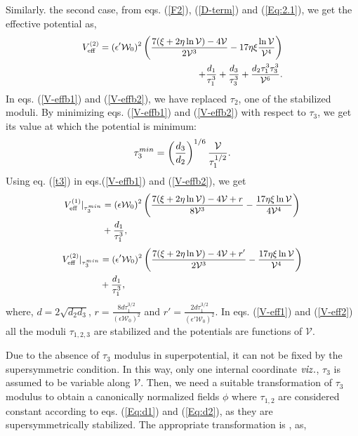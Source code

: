 \documentclass[doublecol]{epl2}
\begin{document}
Similarly. the second case, from eqs. (\ref{F2}), (\ref{D-term}) and (\ref{Eq:2.1}), we get the effective potential as, 
\begin{equation}\small
\begin{split}
    V_{\mathrm{eff}}^{(2)}=(\epsilon'\mathcal{W}_0)^2\left(\frac{7(\xi+2\eta\ln\mathcal{V})-4\mathcal{V}}{2\mathcal{V}^3}-17\eta\xi\frac{\ln\mathcal{V}}{\mathcal{V}^4}\right)\\+\frac{d_1}{\tau_1^3}+\frac{d_3}{\tau_3^3}+\frac{d_2\tau_1^3\tau_3^3}{\mathcal{V}^6}.
    \label{V-effb2}
    \end{split}
\end{equation}In eqs. (\ref{V-effb1}) and (\ref{V-effb2}), we have replaced $\tau_2$, one of the stabilized moduli.    By minimizing eqs. (\ref{V-effb1}) and (\ref{V-effb2}) with respect to $\tau_3$, we get its value at which the potential is minimum:
\begin{equation}\small
    \tau_3^{min}=\left(\frac{d_3}{d_2}\right)^{1/6}\frac{\mathcal{V}}{\tau_1^{1/2}}.
    \label{t3}
\end{equation}Using eq. (\ref{t3}) in eqs.(\ref{V-effb1}) and (\ref{V-effb2}), we get
 \begin{equation}\small
    \begin{split}
V_{\mathrm{eff}}^{(1)}|_{\tau_3^{min}}&=(\epsilon\mathcal{W}_0)^2\left(\frac{7(\xi+2\eta\ln\mathcal{V})-4\mathcal{V}+r}{8\mathcal{V}^3}-\frac{17\eta\xi\ln\mathcal{V}}{4\mathcal{V}^4}\right) \\&+ \frac{d_1}{\tau_1^3},
\end{split}
\label{V-eff1}
\end{equation}
 \begin{equation}\small
     \begin{split}
V_{\mathrm{eff}}^{(2)}|_{\tau_3^{min}}&=(\epsilon'\mathcal{W}_0)^2\left(\frac{7(\xi+2\eta\ln\mathcal{V})-4\mathcal{V}+r'}{2\mathcal{V}^3}-\frac{17\eta\xi\ln\mathcal{V}}{\mathcal{V}^4}\right)\\&+\frac{d_1}{\tau_1^3},
\end{split}
\label{V-eff2}
 \end{equation}
 where, $d=2\sqrt{d_2d_3}$, $r=\frac{8d\tau_1^{3/2}}{(\epsilon\mathcal{W}_0)^2}$ and $r'=\frac{2d\tau_1^{3/2}}{(\epsilon'\mathcal{W}_0)^2}$. In eqs. (\ref{V-eff1}) and (\ref{V-eff2}) all the moduli $\tau_{1,2,3}$ are stabilized and the potentials are functions of $\mathcal{V}$.\par Due to the absence of $\tau_3$ modulus in superpotential, it can not be fixed by the supersymmetric condition. In this way, only one internal coordinate $\it{viz.}$, $\tau_3$ is assumed to be variable along $\mathcal{V}$. Then, we need a suitable transformation of $\tau_3$ modulus to obtain a canonically normalized fields $\phi$ where $\tau_{1,2}$ are considered constant according to eqs. (\ref{Eq:d1}) and (\ref{Eq:d2}), as they are supersymmetrically stabilized. The appropriate transformation is \cite{Antoniadis:2018ngr, Let:2022fmu}, as,
\end{document}
